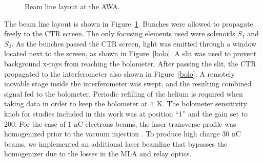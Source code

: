 \begin{figure}%
	\centering
	\begin{tikzpicture}[scale=0.8, text=black]
	
	\end{tikzpicture}	
	\caption{Beam line layout at the AWA.}
	\label{beamline}
\end{figure}
The beam line layout is shown in Figure~\ref{beamline}. 
Bunches were allowed to propagate freely to the 
CTR screen. The only focusing elements used were solenoids $S_1$ and
$S_2$. As the bunches passed the CTR screen, light was
emitted through a window located next to the screen, 
as shown in Figure~\ref{bolo}. A slit was used to prevent
background x-rays from reaching the bolometer.
After passing the slit, the CTR propagated to the 
interferometer also shown in Figure~\ref{bolo}.  %
A remotely movable stage inside the interferometer was swept, 
and the resulting combined signal fed to the bolometer. 
Periodic refilling of the helium is required when taking data in order
to keep the bolometer at \SI{4}{K}. The bolometer sensitivity knob for studies included in this work was at position ``1'' and
the gain set to 200.
For the case of 1 nC electrons beams, the laser transverse profile was homogenized prior to the vacuum injection \cite{PhysRevAccelBeams.20.103404}.
To produce high charge 30 nC beams, we implemented an additional laser beamline that bypasses the homogenizer due to the losses in the 
MLA and relay optics.

